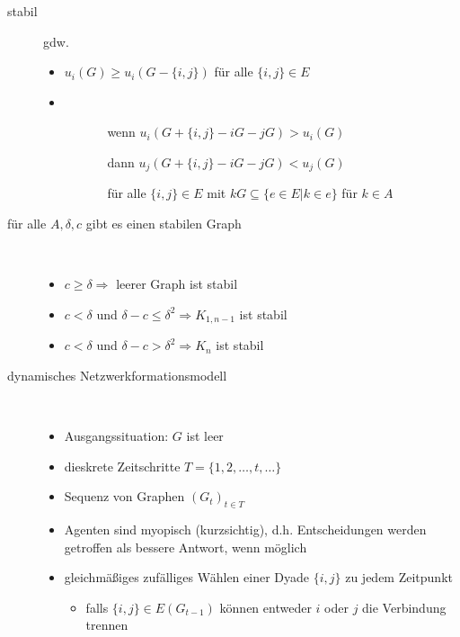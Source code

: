 	\begin{description}
		\item[stabil] gdw.
			\begin{itemize}
				\item $u_i(G)\geq u_i(G-\{i,j\})$ für alle $\{i,j\}\in E$
				\item \ \vspace*{-1.25\baselineskip}
					\begin{itemize}
						\item[] \begin{itemize}
							\item[wenn] $u_i(G+\{i,j\}-iG-jG)>u_i(G)$
							\item[dann] $u_j(G+\{i,j\}-iG-jG)<u_j(G)$
							\item[] für alle $\{i,j\}\in E$ mit $kG\subseteq\{e\in E|k\in e\}$ für $k\in A$
						\end{itemize}
					\end{itemize}
			\end{itemize}
		\item[für alle $A,\delta,c$ gibt es einen stabilen Graph]\ \\\vspace*{-\baselineskip}
			\begin{itemize}
				\item $c\geq \delta\Rightarrow$ leerer Graph ist stabil
				\item $c<\delta$ und $\delta-c\leq \delta^2\Rightarrow K_{1,n-1}$ ist stabil
				\item $c<\delta$ und $\delta-c>\delta^2\Rightarrow K_n$ ist stabil
			\end{itemize}
		\item[dynamisches Netzwerkformationsmodell]\ \\\vspace*{-\baselineskip}
			\begin{itemize}
				\item Ausgangssituation: $G$ ist leer
				\item dieskrete Zeitschritte $T=\{1,2,\dots,t,\dots\}$
				\item Sequenz von Graphen $(G_t)_{t\in T}$
				\item Agenten sind myopisch (kurzsichtig), d.h. Entscheidungen werden getroffen als bessere Antwort, wenn möglich
				\item gleichmäßiges zufälliges  Wählen einer Dyade $\{i,j\}$  zu jedem Zeitpunkt
					\begin{itemize}
						\item falls $\{i,j\}\in E(G_{t-1})$ können entweder $i$ oder $j$ die Verbindung trennen

\end{itemize}
\end{itemize}
\end{description}
